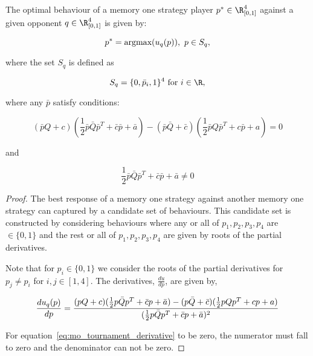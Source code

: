 \begin{lemma}\label{lemma:memone_best_response}
    The optimal behaviour of a memory one strategy player \(p^* \in \R_{[0, 1]} ^ 4\)
    against a given opponent \(q \in \R_{[0, 1]} ^ 4\) is given by:

    \[p^* = \textnormal{argmax}(u_q(p)), \ p \in S_q,\]

    where the set \(S_q\) is defined as

    \[S_q = \{0, \bar{p}_i, 1 \}^4 \text{ for } i \in \R,\]

    where any \(\bar{p}\) satisfy conditions:

    {\small
    \begin{equation}\label{eq:derivative_numerator_condition}
        (\bar{p}Q + c) ( \frac{1}{2} \bar{p}  \bar{Q}  \bar{p}^T + \bar{c}  \bar{p} + \bar{a})
        - (\bar{p}\bar{Q} + \bar{c})( \frac{1}{2} \bar{p}  Q  \bar{p}^T + c \bar{p} + a) = 0
    \end{equation}}

    and

    {\small
    \begin{equation}\label{eq:derivative_denominator_condition}
        \frac{1}{2} \bar{p}  \bar{Q}  \bar{p}^T + \bar{c}  \bar{p} + \bar{a} \neq 0
    \end{equation}}
\end{lemma}

\begin{proof} The best response of a memory one strategy against another memory
    one strategy can captured by a candidate set of behaviours. This candidate
    set is constructed by considering behaviours where any or all of \(p_1, p_2,
    p_3, p_4\) are \(\in \{0, 1\}\) and the rest or all of \(p_1, p_2, p_3,
    p_4\) are given by roots of the partial derivatives.

    Note that for \(p_i \in \{0, 1\}\) we consider the roots of the partial
    derivatives for \(p_j \neq p_i\) for \(i,j \in [1, 4]\). The derivatives,
    \(\frac{du}{dp}\), are given by,

    \begin{equation}\label{eq:mo_derivative}
        \frac{du_q (p)}{dp}  = \frac{(pQ + c) ( \frac{1}{2} p  \bar{Q}  p^T + \bar{c}  p + \bar{a})
        - (p\bar{Q} + \bar{c})( \frac{1}{2} p  Q  p^T + c p + a)}
          {( \frac{1}{2} p  \bar{Q}  p^T + \bar{c}  p + \bar{a})^2} \\
    \end{equation}

    For equation~\ref{eq:mo_tournament_derivative} to be zero, the numerator must fall
    to zero and the denominator can not be zero.
\end{proof}

